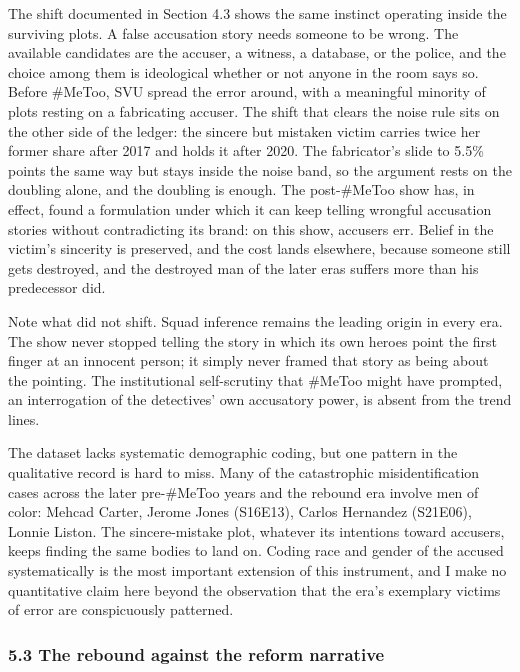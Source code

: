 \documentclass[
]{article}
\begin{document}
The shift documented in Section 4.3 shows the same instinct operating
inside the surviving plots. A false accusation story needs someone to be
wrong. The available candidates are the accuser, a witness, a database,
or the police, and the choice among them is ideological whether or not
anyone in the room says so. Before \#MeToo, SVU spread the error around,
with a meaningful minority of plots resting on a fabricating accuser.
The shift that clears the noise rule sits on the other side of the
ledger: the sincere but mistaken victim carries twice her former share
after 2017 and holds it after 2020. The fabricator's slide to 5.5\%
points the same way but stays inside the noise band, so the argument
rests on the doubling alone, and the doubling is enough. The
post-\#MeToo show has, in effect, found a formulation under which it can
keep telling wrongful accusation stories without contradicting its
brand: on this show, accusers err. Belief in the victim's sincerity is
preserved, and the cost lands elsewhere, because someone still gets
destroyed, and the destroyed man of the later eras suffers more than his
predecessor did.

Note what did not shift. Squad inference remains the leading origin in
every era. The show never stopped telling the story in which its own
heroes point the first finger at an innocent person; it simply never
framed that story as being about the pointing. The institutional
self-scrutiny that \#MeToo might have prompted, an interrogation of the
detectives' own accusatory power, is absent from the trend lines.

The dataset lacks systematic demographic coding, but one pattern in the
qualitative record is hard to miss. Many of the catastrophic
misidentification cases across the later pre-\#MeToo years and the
rebound era involve men of color: Mehcad Carter, Jerome Jones (S16E13),
Carlos Hernandez (S21E06), Lonnie Liston. The sincere-mistake plot,
whatever its intentions toward accusers, keeps finding the same bodies
to land on. Coding race and gender of the accused systematically is the
most important extension of this instrument, and I make no quantitative
claim here beyond the observation that the era's exemplary victims of
error are conspicuously patterned.

\subsubsection{5.3 The rebound against the reform
narrative}\label{the-rebound-against-the-reform-narrative}
\end{document}
